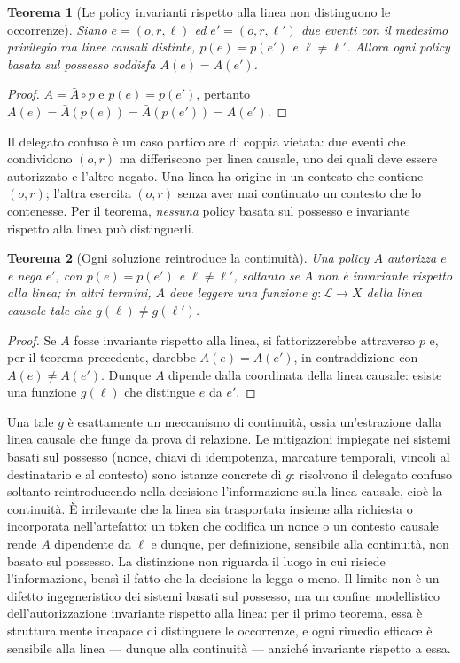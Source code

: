 \documentclass[11pt]{article}
\newtheorem{theorem}{Teorema}
\begin{document}
\begin{theorem}[Le policy invarianti rispetto alla linea non distinguono le
occorrenze]
Siano $e = (o,r,\ell)$ ed $e' = (o,r,\ell')$ due eventi con il medesimo
privilegio ma linee causali distinte, $p(e) = p(e')$ e $\ell \neq \ell'$. Allora
ogni policy basata sul possesso soddisfa $A(e) = A(e')$.
\end{theorem}

\begin{proof}
$A = \bar{A} \circ p$ e $p(e) = p(e')$, pertanto
$A(e) = \bar{A}(p(e)) = \bar{A}(p(e')) = A(e')$.
\end{proof}

Il delegato confuso è un caso particolare di coppia vietata: due eventi che
condividono $(o,r)$ ma differiscono per linea causale, uno dei quali deve essere
autorizzato e l'altro negato. Una linea ha origine in un contesto che contiene
$(o,r)$; l'altra esercita $(o,r)$ senza aver mai continuato un contesto che lo
contenesse. Per il teorema, \emph{nessuna} policy basata sul possesso e
invariante rispetto alla linea può distinguerli.

\begin{theorem}[Ogni soluzione reintroduce la continuità]\label{thm:reintro}
Una policy $A$ autorizza $e$ e nega $e'$, con $p(e) = p(e')$ e
$\ell \neq \ell'$, soltanto se $A$ non è invariante rispetto alla linea; in
altri termini, $A$ deve leggere una funzione $g : \mathcal{L} \to X$ della linea
causale tale che $g(\ell) \neq g(\ell')$.
\end{theorem}

\begin{proof}
Se $A$ fosse invariante rispetto alla linea, si fattorizzerebbe attraverso $p$
e, per il teorema precedente, darebbe $A(e) = A(e')$, in contraddizione con
$A(e) \neq A(e')$. Dunque $A$ dipende dalla coordinata della linea causale:
esiste una funzione $g(\ell)$ che distingue $e$ da $e'$.
\end{proof}

Una tale $g$ è esattamente un meccanismo di continuità, ossia un'estrazione
dalla linea causale che funge da prova di relazione. Le mitigazioni impiegate
nei sistemi basati sul possesso (nonce, chiavi di idempotenza, marcature
temporali, vincoli al destinatario e al contesto) sono istanze concrete di $g$:
risolvono il delegato confuso soltanto reintroducendo nella decisione
l'informazione sulla linea causale, cioè la continuità. È irrilevante che la
linea sia trasportata insieme alla richiesta o incorporata nell'artefatto: un
token che codifica un nonce o un contesto causale rende $A$ dipendente da $\ell$
e dunque, per definizione, sensibile alla continuità, non basato sul possesso.
La distinzione non riguarda il luogo in cui risiede l'informazione, bensì il
fatto che la decisione la legga o meno. Il limite non è un difetto ingegneristico
dei sistemi basati sul possesso, ma un confine modellistico dell'autorizzazione
invariante rispetto alla linea: per il primo teorema, essa è strutturalmente
incapace di distinguere le occorrenze, e ogni rimedio efficace è sensibile alla
linea --- dunque alla continuità --- anziché invariante rispetto a essa.
\end{document}
